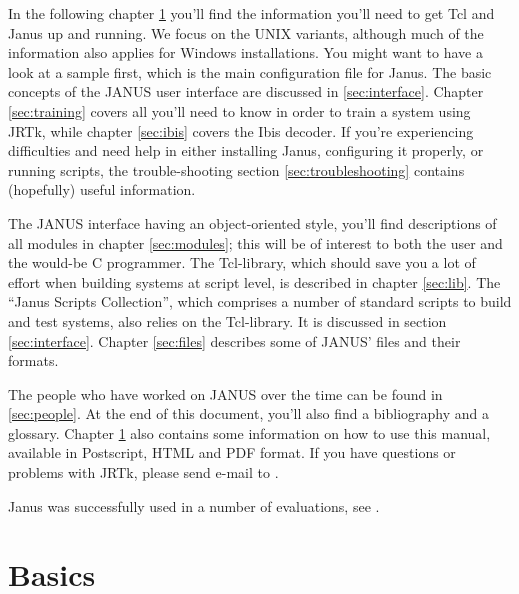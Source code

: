 \documentclass[a4paper,twoside]{book}
\newif\ifpdf
\newcommand{\Jref}      [2]{\htmlref{\texttt{#2}}{#1:#2}}
\begin{document}
In the following chapter \ref{sec:basics}  you'll find the information
you'll need to get Tcl and Janus up and running.  We focus on the UNIX
variants, although much of  the information  also applies for  Windows
installations.  You    might   want to  have  a   look  at    a sample
\Jref{file}{.janusrc} first, which  is the main configuration file for
Janus. The basic concepts of the JANUS user interface are discussed in
\ref{sec:interface}. Chapter \ref{sec:training} covers all you'll need
to   know   in order to  train  a   system using  JRTk,  while chapter
\ref{sec:ibis} covers    the  Ibis decoder.   If   you're experiencing
difficulties and need help in either  installing Janus, configuring it
properly,   or    running  scripts,  the    trouble-shooting   section
\ref{sec:troubleshooting} contains (hopefully) useful information.

The JANUS interface   having  an object-oriented style,    you'll find
descriptions of all modules in chapter \ref{sec:modules}; this will be
of  interest to  both the  user  and the would-be  C  programmer.  The
Tcl-library, which   should save you  a lot   of effort when  building
systems at  script level, is  described in chapter \ref{sec:lib}.  The
``Janus  Scripts Collection'', which   comprises a number  of standard
scripts to build and test systems, also relies  on the Tcl-library. It
is discussed  in section \ref{sec:interface}.  Chapter \ref{sec:files}
describes some of JANUS' files and their formats.

The people  who have worked on   JANUS over the  time can  be found in
\ref{sec:people}.  At  the end of  this document,  you'll also  find a
bibliography and a  glossary.  Chapter \ref{sec:basics}  also contains
some  information on how to use  this manual, available in Postscript,
HTML and  PDF  format. If you  have  questions or problems  with JRTk,
please             send                      e-mail                 to
.

Janus was   successfully  used in    a   number of  evaluations,   see
\cite{finke:swb97,soltau:icassp2004,metze:nist2004}.



\chapter{Basics} \label{sec:basics}
\end{document}
